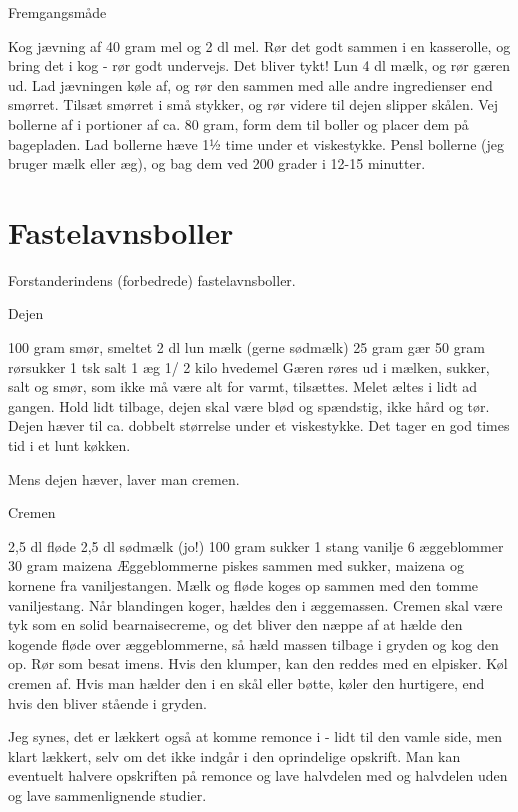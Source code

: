 \documentclass[
]{book}
\begin{document}
Fremgangsmåde

Kog jævning af 40 gram mel og 2 dl mel. Rør det godt sammen i en kasserolle, og bring det i kog - rør godt undervejs. Det bliver tykt!
Lun 4 dl mælk, og rør gæren ud.
Lad jævningen køle af, og rør den sammen med alle andre ingredienser end smørret.
Tilsæt smørret i små stykker, og rør videre til dejen slipper skålen.
Vej bollerne af i portioner af ca. 80 gram, form dem til boller og placer dem på bagepladen.
Lad bollerne hæve 1½ time under et viskestykke.
Pensl bollerne (jeg bruger mælk eller æg), og bag dem ved 200 grader i 12-15 minutter.

\section{Fastelavnsboller}\label{fastelavnsboller}

Forstanderindens (forbedrede) fastelavnsboller.

Dejen

100 gram smør, smeltet 2 dl lun mælk (gerne sødmælk) 25 gram gær 50 gram rørsukker 1 tsk salt 1 æg 1/ 2 kilo hvedemel Gæren røres ud i mælken, sukker, salt og smør, som ikke må være alt for varmt, tilsættes. Melet æltes i lidt ad gangen. Hold lidt tilbage, dejen skal være blød og spændstig, ikke hård og tør. Dejen hæver til ca. dobbelt størrelse under et viskestykke. Det tager en god times tid i et lunt køkken.

Mens dejen hæver, laver man cremen.

Cremen

2,5 dl fløde 2,5 dl sødmælk (jo!) 100 gram sukker 1 stang vanilje 6 æggeblommer 30 gram maizena Æggeblommerne piskes sammen med sukker, maizena og kornene fra vaniljestangen. Mælk og fløde koges op sammen med den tomme vaniljestang. Når blandingen koger, hældes den i æggemassen. Cremen skal være tyk som en solid bearnaisecreme, og det bliver den næppe af at hælde den kogende fløde over æggeblommerne, så hæld massen tilbage i gryden og kog den op. Rør som besat imens. Hvis den klumper, kan den reddes med en elpisker. Køl cremen af. Hvis man hælder den i en skål eller bøtte, køler den hurtigere, end hvis den bliver stående i gryden.

Jeg synes, det er lækkert også at komme remonce i - lidt til den vamle side, men klart lækkert, selv om det ikke indgår i den oprindelige opskrift. Man kan eventuelt halvere opskriften på remonce og lave halvdelen med og halvdelen uden og lave sammenlignende studier.
\end{document}
